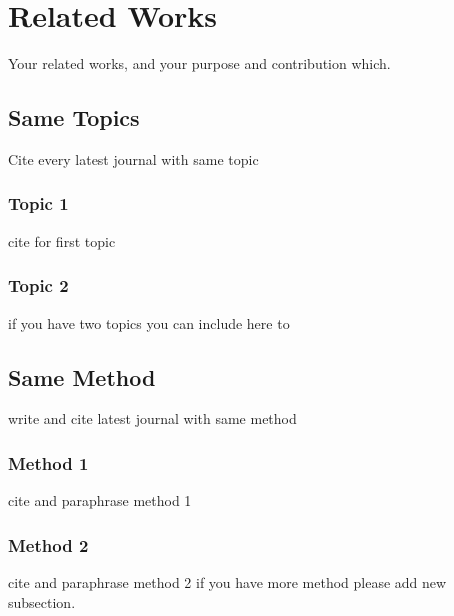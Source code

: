 \chapter{Related Works}

Your related works, and your purpose and contribution which.

\section{Same Topics}
Cite every latest journal with same topic
\subsection{Topic 1}
cite for first topic

\subsection{Topic 2}
if you have two topics you can include here to


\section{Same Method}
write and cite latest journal with same method

\subsection{Method 1}
cite and paraphrase method 1

\subsection{Method 2}
cite and paraphrase method 2 if you have more method please add new subsection.

 